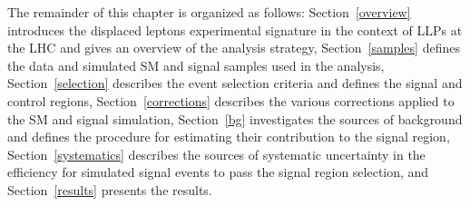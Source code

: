 The remainder of this chapter is organized as follows: Section~\ref{overview} introduces the displaced leptons experimental signature in the context of LLPs at the LHC and gives an overview of the analysis strategy, Section~\ref{samples} defines the data and simulated SM and signal samples used in the analysis, Section~\ref{selection} describes the event selection criteria and defines the signal and control regions, Section~\ref{corrections} describes the various corrections applied to the SM and signal simulation, Section~\ref{bg} investigates the sources of background and defines the procedure for estimating their contribution to the signal region, Section~\ref{systematics} describes the sources of systematic uncertainty in the efficiency for simulated signal events to pass the signal region selection, and Section~\ref{results} presents the results.








